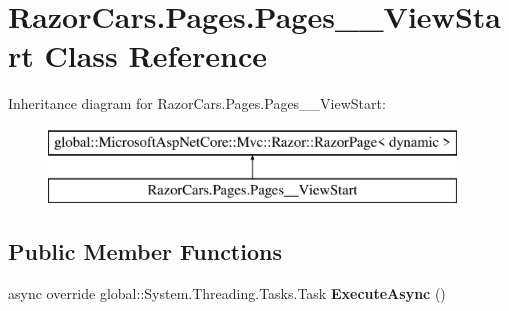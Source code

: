 \hypertarget{class_razor_cars_1_1_pages_1_1_pages_____view_start}{}\section{Razor\+Cars.\+Pages.\+Pages\+\_\+\+\_\+\+View\+Start Class Reference}
\label{class_razor_cars_1_1_pages_1_1_pages_____view_start}
Inheritance diagram for Razor\+Cars.\+Pages.\+Pages\+\_\+\+\_\+\+View\+Start\+:\begin{figure}[H]
\begin{center}
\leavevmode
\includegraphics[height=2.000000cm]{class_razor_cars_1_1_pages_1_1_pages_____view_start}
\end{center}
\end{figure}
\subsection*{Public Member Functions}
\begin{DoxyCompactItemize}
\item 
\mbox{\label{class_razor_cars_1_1_pages_1_1_pages_____view_start_ac902f3b187e79b73a977fe4d41e9bc54}} 
async override global\+::\+System.\+Threading.\+Tasks.\+Task {\bfseries Execute\+Async} ()
\end{DoxyCompactItemize}
